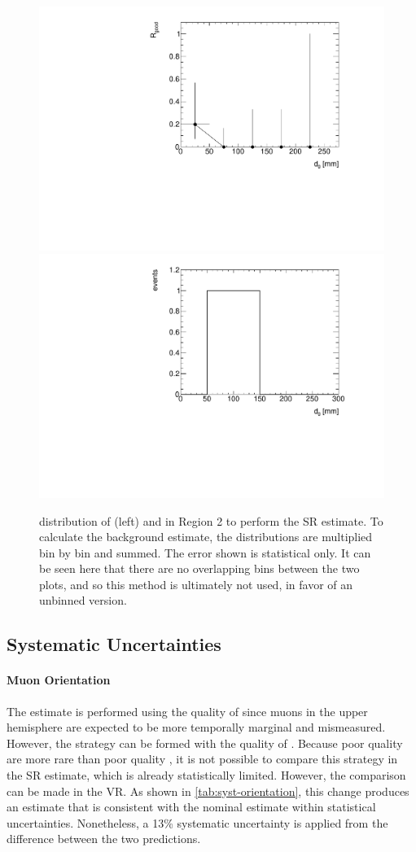 \begin{figure}[!ht]
\centering
\includegraphics[width=.48\textwidth]{figures/cosmics/d0_SR_v4_rgood.pdf}
\includegraphics[width=.48\textwidth]{figures/cosmics/d0_SR_v4_2mu.pdf}
\caption{\absdz distribution of \rgood (left) and \mt in Region 2 to perform the SR estimate. To calculate the background estimate, the distributions are multiplied bin by bin and summed. The error shown is statistical only. It can be seen here that there are no overlapping bins between the two plots, and so this method is ultimately not used, in favor of an unbinned version.}
\label{fig:SR-rgood}
\end{figure}

\subsection{\label{sec:cos_syst}Systematic Uncertainties}

\paragraph{Muon Orientation}

The estimate is performed using the quality of \mt since muons in the upper hemisphere are expected to be more temporally marginal and mismeasured. However, the strategy can be formed with the quality of \mb. Because poor quality \mb are more rare than poor quality \mt, it is not possible to compare this strategy in the SR estimate, which is already statistically limited. However, the comparison can be made in the VR. As shown in \autoref{tab:syst-orientation}, this change produces an estimate that is consistent with the nominal estimate within statistical uncertainties. Nonetheless, a 13\% systematic uncertainty is applied from the difference between the two predictions.

